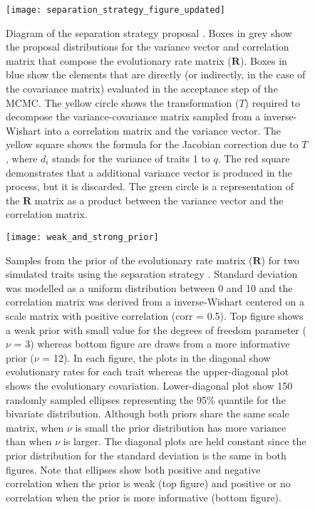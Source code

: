 \pagebreak

\begin{figure}[h]
	\centering
	\texttt{[image: separation\_strategy\_figure\_updated]}
	\caption[Diagram of the separation strategy proposal.]{Diagram of the separation strategy proposal \citep{barnard_modeling_2000}. Boxes in grey show the proposal distributions for the variance vector and correlation matrix that compose the evolutionary rate matrix ($\mathbf{R}$). Boxes in blue show the elements that are directly (or indirectly, in the case of the covariance matrix) evaluated in the acceptance step of the MCMC. The yellow circle shows the transformation ($T$) required to decompose the variance-covariance matrix sampled from a inverse-Wishart into a correlation matrix and the variance vector. The yellow square shows the formula for the Jacobian correction due to $T$ \citep{zhang_sampling_2006}, where $d_{i}$ stands for the variance of traits 1 to $q$. The red square demonstrates that a additional variance vector is produced in the process, but it is discarded. The green circle is a representation of the $\mathbf{R}$ matrix as a product between the variance vector and the correlation matrix.}
	\label{fig:proposal}
\end{figure}

\begin{figure}[h]
	\centering
	\texttt{[image: weak\_and\_strong\_prior]}
	\caption[Samples from the prior of the evolutionary rate matrix ($\mathbf{R}$) for two simulated traits using the separation strategy.]{Samples from the prior of the evolutionary rate matrix ($\mathbf{R}$) for two simulated traits using the separation strategy \citep{barnard_modeling_2000}. Standard deviation was modelled as a uniform distribution between 0 and 10 and the correlation matrix was derived from a inverse-Wishart centered on a scale matrix with positive correlation (corr = 0.5). Top figure shows a weak prior with small value for the degrees of freedom parameter ($\nu$ = 3) whereas bottom figure are draws from a more informative prior ($\nu$ = 12). In each figure, the plots in the diagonal show evolutionary rates for each trait whereas the upper-diagonal plot shows the evolutionary covariation. Lower-diagonal plot show 150 randomly sampled ellipses representing the 95\% quantile for the bivariate distribution. Although both priors share the same scale matrix, when $\nu$ is small the prior distribution has more variance than when $\nu$ is larger. The diagonal plots are held constant since the prior distribution for the standard deviation is the same in both figures. Note that ellipses show both positive and negative correlation when the prior is weak (top figure) and positive or no correlation when the prior is more informative (bottom figure).}
	\label{fig:prior_samples}
\end{figure}

